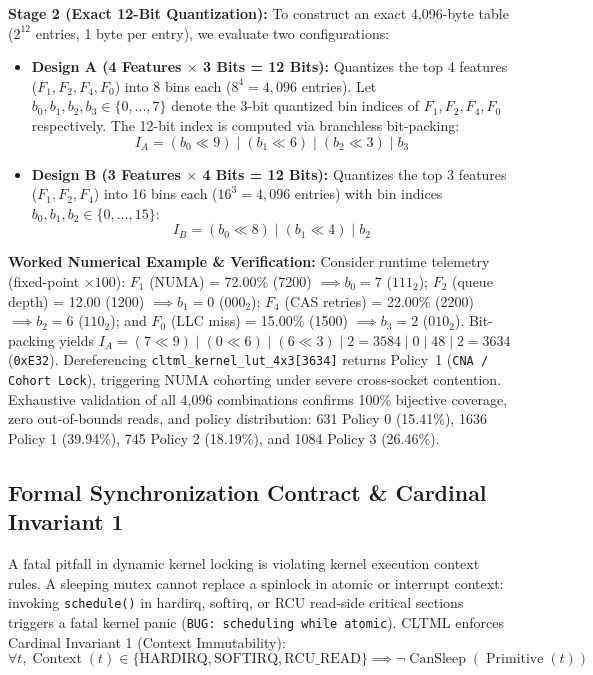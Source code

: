 \documentclass[conference]{IEEEtran}
\begin{document}
\textbf{Stage 2 (Exact 12-Bit Quantization):} To construct an exact 4,096-byte table ($2^{12}$ entries, 1 byte per entry), we evaluate two configurations:
\begin{itemize}
    \item \textbf{Design A (4 Features $\times$ 3 Bits = 12 Bits):} Quantizes the top 4 features ($F_1, F_2, F_4, F_0$) into 8 bins each ($8^4 = 4,096$ entries). Let $b_0, b_1, b_2, b_3 \in \{0,\dots,7\}$ denote the 3-bit quantized bin indices of $F_1, F_2, F_4, F_0$ respectively. The 12-bit index is computed via branchless bit-packing:
    \begin{equation}
    I_A = (b_0 \ll 9) \mid (b_1 \ll 6) \mid (b_2 \ll 3) \mid b_3 \label{eq:idx_a}
    \end{equation}
    \item \textbf{Design B (3 Features $\times$ 4 Bits = 12 Bits):} Quantizes the top 3 features ($F_1, F_2, F_4$) into 16 bins each ($16^3 = 4,096$ entries) with bin indices $b_0, b_1, b_2 \in \{0,\dots,15\}$:
    \begin{equation}
    I_B = (b_0 \ll 8) \mid (b_1 \ll 4) \mid b_2 \label{eq:idx_b}
    \end{equation}
\end{itemize}
\textbf{Worked Numerical Example \& Verification:} Consider runtime telemetry (fixed-point $\times 100$): $F_1$ (NUMA) = 72.00\% (7200) $\implies b_0 = 7$ ($111_2$); $F_2$ (queue depth) = 12.00 (1200) $\implies b_1 = 0$ ($000_2$); $F_4$ (CAS retries) = 22.00\% (2200) $\implies b_2 = 6$ ($110_2$); and $F_0$ (LLC miss) = 15.00\% (1500) $\implies b_3 = 2$ ($010_2$). Bit-packing yields $I_A = (7 \ll 9) \mid (0 \ll 6) \mid (6 \ll 3) \mid 2 = 3584 \mid 0 \mid 48 \mid 2 = 3634$ (\texttt{0xE32}). Dereferencing \texttt{cltml\_kernel\_lut\_4x3[3634]} returns Policy~1 (\texttt{CNA / Cohort Lock}), triggering NUMA cohorting under severe cross-socket contention. Exhaustive validation of all 4,096 combinations confirms 100\% bijective coverage, zero out-of-bounds reads, and policy distribution: 631 Policy 0 (15.41\%), 1636 Policy 1 (39.94\%), 745 Policy 2 (18.19\%), and 1084 Policy 3 (26.46\%).

\subsection{Formal Synchronization Contract \& Cardinal Invariant 1}
A fatal pitfall in dynamic kernel locking is violating kernel execution context rules. A sleeping mutex cannot replace a spinlock in atomic or interrupt context: invoking \texttt{schedule()} in hardirq, softirq, or RCU read-side critical sections triggers a fatal kernel panic (\texttt{BUG: scheduling while atomic}). CLTML enforces Cardinal Invariant 1 (Context Immutability):
\begin{equation}
\forall t, \operatorname{Context}(t) \in \{\text{HARDIRQ}, \text{SOFTIRQ}, \text{RCU\_READ}\} \implies \neg\operatorname{CanSleep}(\operatorname{Primitive}(t)) \label{eq:invariant}
\end{equation}
\end{document}
